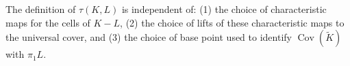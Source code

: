 The definition of $\tau(K, L)$ is independent of: (1) the choice of characteristic maps for the cells of $K-L$, (2) the choice of lifts of these characteristic maps to the universal cover, and (3) the choice of base point used to identify $\operatorname{Cov}(\tilde{K})$ with $\pi_1 L$.
